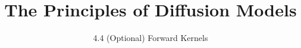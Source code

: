 ﻿%

\graphicspath{{../images/}}
\title{The Principles of Diffusion Models}
\subtitle{4.4 (Optional) Forward Kernels}


\begin{frame}
    \titlepage
\end{frame}


